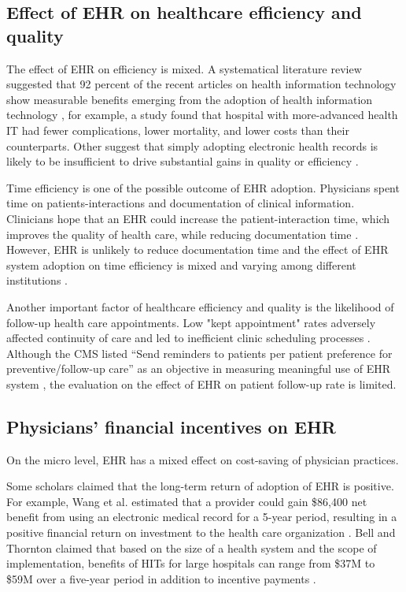 \subsection{Effect of EHR on healthcare efficiency and quality}

The effect of EHR on efficiency is mixed. A systematical literature review suggested that 92 percent of the recent articles on health information technology show measurable benefits emerging from the adoption of health information technology \citep{Buntin2011}, for example, a study found that hospital with more-advanced health IT had fewer complications, lower mortality, and lower costs than their counterparts\citep{amarasingham2009clinical}. Other suggest that simply adopting electronic health records is likely to be insufficient to drive substantial gains in quality or efficiency \citep{DesRoches2010}. 

Time efficiency is one of the possible outcome of EHR adoption. Physicians spent time on patients-interactions and documentation of clinical information. Clinicians hope that an EHR could increase the patient-interaction time, which improves the quality of health care, while reducing documentation time \citep{leung2003incentives}. However, EHR is unlikely to reduce documentation time \citep{poissant2005impact} and the effect of EHR system adoption on time efficiency is mixed and varying among different institutions \citep{Chaudhry2006}.

Another important factor of healthcare efficiency and quality is the likelihood of follow-up health care appointments. Low "kept appointment" rates adversely affected continuity of care and led to inefficient clinic scheduling processes \citep{myers2001strategies}. Although the CMS listed ``Send reminders to patients per patient preference for preventive/follow-up care'' as an objective in measuring meaningful use of EHR system \citep{cmsincentive14}, the evaluation on the effect of EHR on patient follow-up rate is limited.


\subsection{Physicians' financial incentives on EHR}
On the micro level, EHR has a mixed effect on cost-saving of physician practices.

Some scholars claimed that the long-term return of adoption of EHR is positive. For example, Wang et al. estimated that a provider could gain \$86,400 net benefit from using an electronic medical record for a 5-year period, resulting in a positive financial return on investment to the health care organization \citep{Wang2003}. Bell and Thornton claimed that based on the size of a health system and the scope of implementation, benefits of HITs for large hospitals can range from \$37M to \$59M over a five-year period in addition to incentive payments \citep{Bell2011}.

